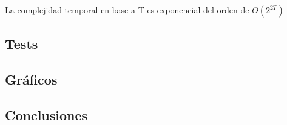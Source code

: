 \documentclass[11pt, a4paper, spanish]{article}
\begin{document}
	La complejidad temporal en base a T es exponencial del orden de $O(2^{2T})$
	
	\subsection{Tests}
	\subsection{Gr\'aficos}
	
	\begin{center}
	\end{center}
	
	\subsection{Conclusiones}
\newpage
\end{document}
